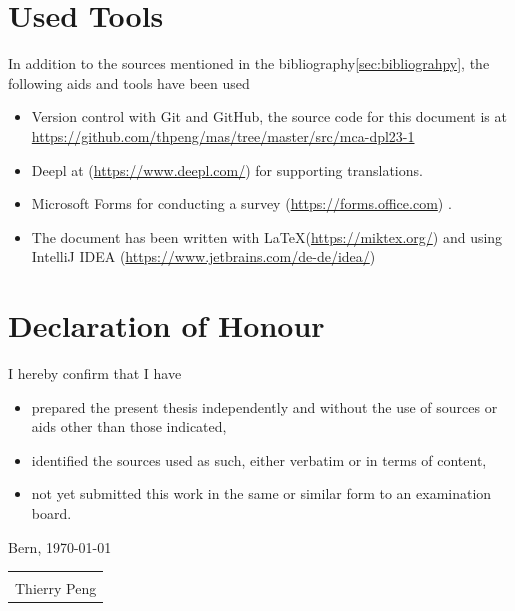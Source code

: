 \documentclass[a4paper,12pt]{article}
\begin{document}
    \section*{Used Tools}
    In addition to the sources mentioned in the bibliography\ref{sec:bibliograhpy}, the following aids and tools have been used
    \begin{itemize}
        \item Version control with Git and GitHub, the source code for this document is at \url{https://github.com/thpeng/mas/tree/master/src/mca-dpl23-1}
        \item Deepl at (\url{https://www.deepl.com/}) for supporting translations.
        \item Microsoft Forms for conducting a survey (\url{https://forms.office.com}) .
        \item The document has been written with \LaTeX  (\url{https://miktex.org/}) and using IntelliJ IDEA (\url{https://www.jetbrains.com/de-de/idea/})
    \end{itemize}

    \section*{Declaration of Honour}

    I hereby confirm that I have
    \begin{itemize}
        \item prepared the present thesis independently and without the use of sources or aids other than those indicated,
        \item identified the sources used as such, either verbatim or in terms of content,
        \item not yet submitted this work in the same or similar form to an examination board.
    \end{itemize}
    Bern, \today\newline
    \newline
    \newline
    \newline
    \begin{tabular}{@{}p{5.0cm}@{}}
        \hrulefill \\
        Thierry Peng
    \end{tabular}

    \pagebreak

\end{document}
